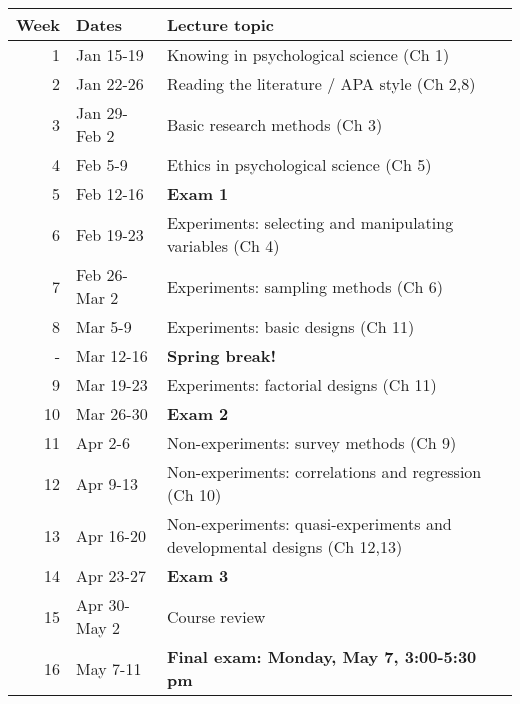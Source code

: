 \documentclass[10pt]{article}
\begin{document}
\begin{center}
\begin{tabular}{rll}
Week & Dates & Lecture topic\\
\hline
1 & Jan 15-19 & Knowing in psychological science (Ch 1)\\
2 & Jan 22-26 & Reading the literature / APA style (Ch 2,8)\\
3 & Jan 29-Feb 2 & Basic research methods (Ch 3)\\
4 & Feb 5-9 & Ethics in psychological science (Ch 5)\\
5 & Feb 12-16 & \textbf{Exam 1}\\
6 & Feb 19-23 & Experiments: selecting and manipulating variables (Ch 4)\\
7 & Feb 26-Mar 2 & Experiments: sampling methods (Ch 6)\\
8 & Mar 5-9 & Experiments: basic designs (Ch 11)\\
- & Mar 12-16 & \textbf{Spring break!}\\
9 & Mar 19-23 & Experiments: factorial designs (Ch 11)\\
10 & Mar 26-30 & \textbf{Exam 2}\\
11 & Apr 2-6 & Non-experiments: survey methods (Ch 9)\\
12 & Apr 9-13 & Non-experiments: correlations and regression (Ch 10)\\
13 & Apr 16-20 & Non-experiments: quasi-experiments and developmental designs (Ch 12,13)\\
14 & Apr 23-27 & \textbf{Exam 3}\\
15 & Apr 30-May 2 & Course review\\
16 & May 7-11 & \textbf{Final exam: Monday, May 7, 3:00-5:30 pm}\\
\end{tabular}
\end{center}
\end{document}
